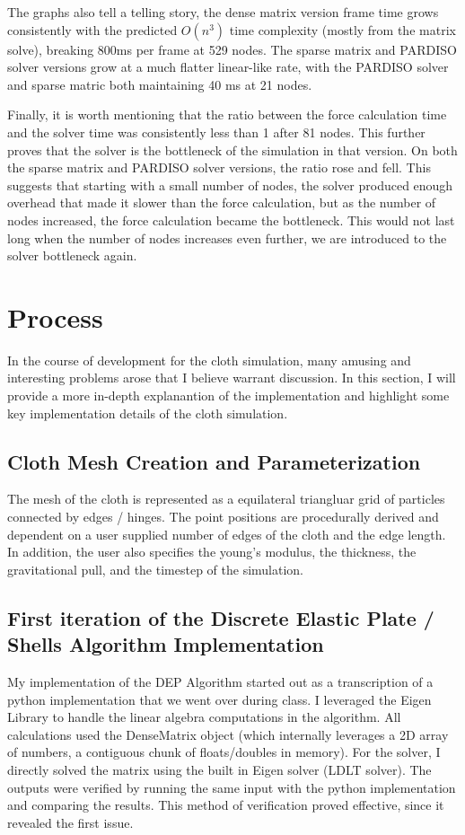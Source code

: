 \documentclass[letterpaper, 10 pt, conference]{ieeeconf}  %
\begin{document}
The graphs also tell a telling story, the dense matrix version frame time grows consistently with the predicted $O(n^3)$ time complexity (mostly from the matrix solve), breaking 800ms per frame at 529 nodes. The sparse matrix and PARDISO solver versions grow at a much flatter linear-like rate, with the PARDISO solver and sparse matric both maintaining 40 ms at 21 nodes.

Finally, it is worth mentioning that the ratio between the force calculation time and the solver time was consistently less than 1 after 81 nodes. This further proves that the solver is the bottleneck of the simulation in that version. On both the sparse matrix and PARDISO solver versions, the ratio rose and fell. This suggests that starting with a small number of nodes, the solver produced enough overhead that made it slower than the force calculation, but as the number of nodes increased, the force calculation became the bottleneck. This would not last long when the number of nodes increases even further, we are introduced to the solver bottleneck again.

\section{Process}
 In the course of development for the cloth simulation, many amusing and interesting problems arose that I believe warrant discussion. In this section, I will provide a more in-depth explanantion of the implementation and highlight some key implementation details of the cloth simulation.

\subsection{Cloth Mesh Creation and Parameterization}
The mesh of the cloth is represented as a equilateral triangluar grid of particles connected by edges / hinges. The point positions are procedurally derived and dependent on a user supplied number of edges of the cloth and the edge length. In addition, the user also specifies the young's modulus, the thickness, the gravitational pull, and the timestep of the simulation.

\subsection{First iteration of the Discrete Elastic Plate / Shells Algorithm Implementation}

My implementation of the DEP Algorithm started out as a transcription of a python implementation that we went over during class. I leveraged the Eigen Library \cite{eigen_library} to handle the linear algebra computations in the algorithm. All calculations used the DenseMatrix object (which internally leverages a 2D array of numbers, a contiguous chunk of floats/doubles in memory). For the solver, I directly solved the matrix using the built in Eigen solver (LDLT solver). The outputs were verified by running the same input with the python implementation and comparing the results. This method of verification proved effective, since it revealed the first issue. 
\end{document}
